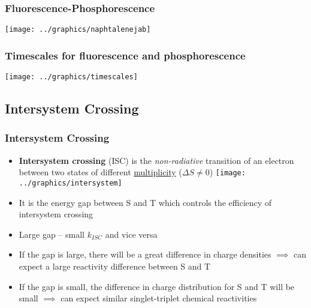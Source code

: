\documentclass[a4paper,12pt,titlepage]{article}
\begin{document}
\begin{frame}
\frametitle{Fluorescence-Phosphorescence}

\texttt{[image: ../graphics/naphtalenejab]}\\

\end{frame}

\begin{frame}
\frametitle{Timescales for fluorescence and phosphorescence}

\texttt{[image: ../graphics/timescales]}
\end{frame}

%
%

\subsection{Intersystem Crossing}

\begin{frame}
\frametitle{Intersystem Crossing}
\begin{itemize}
\item \textbf{Intersystem crossing} (ISC) is the \emph{non-radiative} transition of an electron between two states of different \underline{multiplicity} (\(\Delta S \neq 0\)) \texttt{[image: ../graphics/intersystem]}
\item It is the energy gap between S and T which controls the efficiency of intersystem crossing
\item Large gap -- small \(k_{ISC}\) and vice versa
\item If the gap is large, there will be a great difference in charge densities \(\implies\) can expect a large reactivity difference between S and T
\item If the gap is small, the difference in charge distribution for S and T will be small \(\implies\) can expect similar singlet-triplet chemical reactivities
\end{itemize}
\end{frame}
\end{document}
